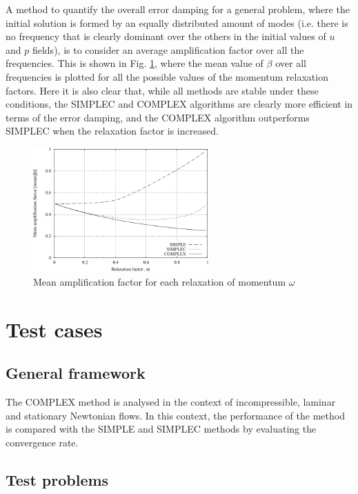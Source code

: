 \documentclass[final,3p,times,10pt,onecolumn]{myElsarticle}
\numberwithin{equation}{section}
\begin{document}
A method to quantify the overall error damping for a general problem, where the initial solution is formed by an equally distributed amount of modes (i.e. there is no frequency that is clearly dominant over the others in the initial values of $u$ and $p$ fields), is to consider an average amplification factor over all the frequencies. This is shown in Fig. \ref{fig:1d}, where the mean value of $\beta$ over all frequencies is plotted for all the possible values of the momentum relaxation factors. Here it is also clear that, while all methods are stable under these conditions, the SIMPLEC and COMPLEX algorithms are clearly more efficient in terms of the error damping, and the COMPLEX algorithm outperforms SIMPLEC when the relaxation factor is increased. 

\begin{figure}[H]
    \centering
    \includegraphics[width=0.6\textwidth]{fig/meanAmp}
    \caption{Mean amplification factor for each relaxation of momentum $\omega$}
    \label{fig:1d}
\end{figure}  

\section{Test cases}
\label{sec:cases}

\subsection{General framework}
The COMPLEX method is analysed in the context of incompressible, laminar and stationary Newtonian flows. In this context, the performance of the method is compared with the SIMPLE and SIMPLEC methods by evaluating the convergence rate.

\subsection{Test problems}
 
\end{document}
